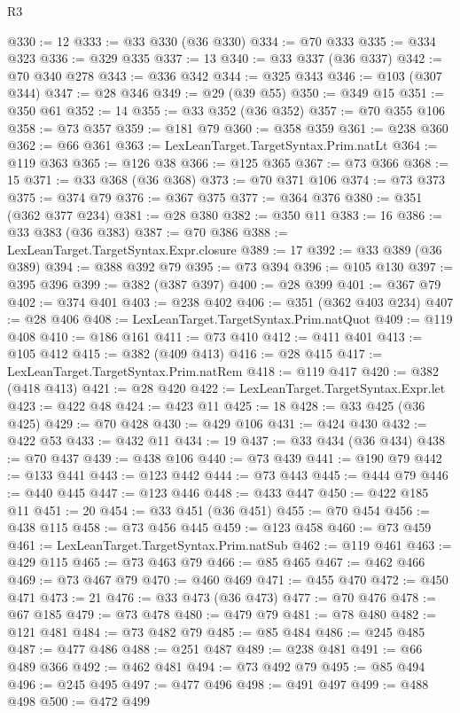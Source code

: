\begin{lexlean}{R3}
\begin{coremodule}
@330 := 12
@333 := @33 @330 (@36 @330)
@334 := @70 @333
@335 := @334 @323
@336 := @329 @335
@337 := 13
@340 := @33 @337 (@36 @337)
@342 := @70 @340 @278
@343 := @336 @342
@344 := @325 @343
@346 := @103 (@307 @344)
@347 := @28 @346
@349 := @29 (@39 @55)
@350 := @349 @15
@351 := @350 @61
@352 := 14
@355 := @33 @352 (@36 @352)
@357 := @70 @355 @106
@358 := @73 @357
@359 := @181 @79
@360 := @358 @359
@361 := @238 @360
@362 := @66 @361
@363 := LexLeanTarget.TargetSyntax.Prim.natLt
@364 := @119 @363
@365 := @126 @38
@366 := @125 @365
@367 := @73 @366
@368 := 15
@371 := @33 @368 (@36 @368)
@373 := @70 @371 @106
@374 := @73 @373
@375 := @374 @79
@376 := @367 @375
@377 := @364 @376
@380 := @351 (@362 @377 @234)
@381 := @28 @380
@382 := @350 @11
@383 := 16
@386 := @33 @383 (@36 @383)
@387 := @70 @386
@388 := LexLeanTarget.TargetSyntax.Expr.closure
@389 := 17
@392 := @33 @389 (@36 @389)
@394 := @388 @392 @79
@395 := @73 @394
@396 := @105 @130
@397 := @395 @396
@399 := @382 (@387 @397)
@400 := @28 @399
@401 := @367 @79
@402 := @374 @401
@403 := @238 @402
@406 := @351 (@362 @403 @234)
@407 := @28 @406
@408 := LexLeanTarget.TargetSyntax.Prim.natQuot
@409 := @119 @408
@410 := @186 @161
@411 := @73 @410
@412 := @411 @401
@413 := @105 @412
@415 := @382 (@409 @413)
@416 := @28 @415
@417 := LexLeanTarget.TargetSyntax.Prim.natRem
@418 := @119 @417
@420 := @382 (@418 @413)
@421 := @28 @420
@422 := LexLeanTarget.TargetSyntax.Expr.let
@423 := @422 @48
@424 := @423 @11
@425 := 18
@428 := @33 @425 (@36 @425)
@429 := @70 @428
@430 := @429 @106
@431 := @424 @430
@432 := @422 @53
@433 := @432 @11
@434 := 19
@437 := @33 @434 (@36 @434)
@438 := @70 @437
@439 := @438 @106
@440 := @73 @439
@441 := @190 @79
@442 := @133 @441
@443 := @123 @442
@444 := @73 @443
@445 := @444 @79
@446 := @440 @445
@447 := @123 @446
@448 := @433 @447
@450 := @422 @185 @11
@451 := 20
@454 := @33 @451 (@36 @451)
@455 := @70 @454
@456 := @438 @115
@458 := @73 @456 @445
@459 := @123 @458
@460 := @73 @459
@461 := LexLeanTarget.TargetSyntax.Prim.natSub
@462 := @119 @461
@463 := @429 @115
@465 := @73 @463 @79
@466 := @85 @465
@467 := @462 @466
@469 := @73 @467 @79
@470 := @460 @469
@471 := @455 @470
@472 := @450 @471
@473 := 21
@476 := @33 @473 (@36 @473)
@477 := @70 @476
@478 := @67 @185
@479 := @73 @478
@480 := @479 @79
@481 := @78 @480
@482 := @121 @481
@484 := @73 @482 @79
@485 := @85 @484
@486 := @245 @485
@487 := @477 @486
@488 := @251 @487
@489 := @238 @481
@491 := @66 @489 @366
@492 := @462 @481
@494 := @73 @492 @79
@495 := @85 @494
@496 := @245 @495
@497 := @477 @496
@498 := @491 @497
@499 := @488 @498
@500 := @472 @499

\end{coremodule}
\end{lexlean}
